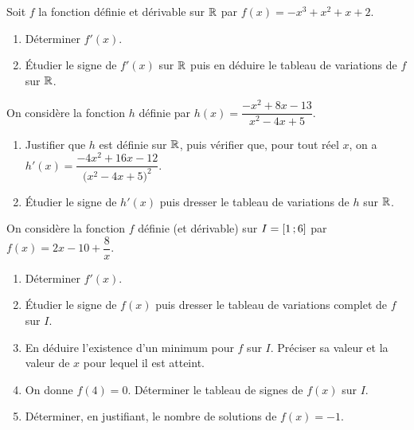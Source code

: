 \documentclass[a4paper,11pt]{article}
\begin{document}
\medskip

Soit $f$ la fonction définie et dérivable sur $\R$ par $f(x)=-x^3+x^2+x+2$.
\begin{enumerate}
	\item Déterminer $f'(x)$.
	\item Étudier le signe de $f'(x)$ sur $\R$ puis en déduire le tableau de variations de $f$ sur $\R$.
\end{enumerate}

\medskip


\medskip

On considère la fonction $h$ définie par $h(x)=\dfrac{-x^2+8x-13}{x^2-4x+5}$.
\begin{enumerate}
	\item Justifier que $h$ est définie sur $\R$, puis vérifier que, pour tout réel $x$, on a $h'(x)=\dfrac{-4x^2+16x-12}{\big( x^2-4x+5\big)^2}$.
	\item Étudier le signe de $h'(x)$ puis dresser le tableau de variations de $h$ sur $\R$.
\end{enumerate}

\medskip


\medskip

On considère la fonction $f$ définie (et dérivable) sur $I=\mbox{\ensuremath{\left[1\mathpunct{};6\right]}}$ par $f(x)=2x-10+\dfrac{8}{x}$.
\begin{enumerate}
	\item Déterminer $f'(x)$.
	\item Étudier le signe de $f(x)$ puis dresser le tableau de variations complet de $f$ sur $I$.
	\item En déduire l'existence d'un minimum pour $f$ sur $I$. Préciser sa valeur et la valeur de $x$ pour lequel il est atteint. 
	\item On donne $f(4)=0$. Déterminer le tableau de signes de $f(x)$ sur $I$.
	\item Déterminer, en justifiant, le nombre de solutions de $f(x)=-1$.
\end{enumerate} 

\medskip


\medskip
\end{document}
